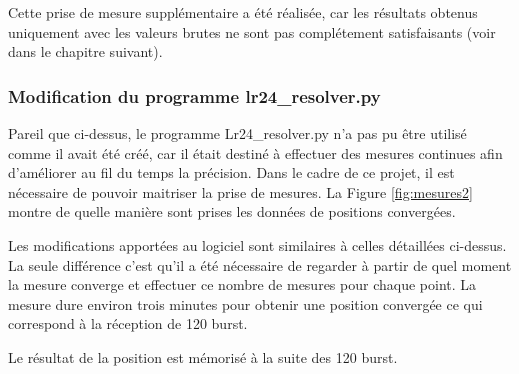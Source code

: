 Cette prise de mesure supplémentaire a été réalisée, car les résultats obtenus uniquement avec les valeurs brutes ne sont pas complétement satisfaisants (voir dans le chapitre suivant). 

\subsubsection{Modification du programme lr24\_resolver.py}
Pareil que ci-dessus, le programme Lr24\_resolver.py n'a pas pu être utilisé comme il avait été créé, car il était destiné à effectuer des mesures continues afin d'améliorer au fil du temps la précision. Dans le cadre de ce projet, il est nécessaire de pouvoir maitriser la prise de mesures. La Figure \ref{fig:mesures2} montre de quelle manière sont prises les données de positions convergées.

Les modifications apportées au logiciel sont similaires à celles détaillées ci-dessus. La seule différence c'est qu'il a été nécessaire de regarder à partir de quel moment la mesure converge et effectuer ce nombre de mesures pour chaque point. La mesure dure environ trois minutes pour obtenir une position convergée ce qui correspond à la réception de 120 burst. 

Le résultat de la position est mémorisé à la suite des 120 burst. 

